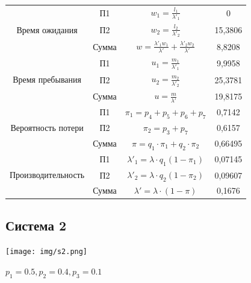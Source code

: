 \begin{tabular}{|c|c|c|c|}
\multirow{3}{*}{Время ожидания}     & П1     & $w_1=\frac{l_1}{\lambda'_1}$                                            & 0        \\ \cline{2-4}
                                    & П2     & $w_2=\frac{l_2}{\lambda'_2}$                                            & 15,3806  \\ \cline{2-4}
                                    & Сумма  & $w = \frac{\lambda'_1 w_1}{\lambda'} + \frac{\lambda'_2 w_2}{\lambda'}$ & 8,8208   \\ \hline
\multirow{3}{*}{Время пребывания}   & П1     & $u_1 = \frac{m_1}{\lambda'_1}$                                          & 9,9958  \\ \cline{2-4}
                                    & П2     & $u_2 = \frac{m_2}{\lambda'_2}$                                          & 25,3781  \\ \cline{2-4}
                                    & Сумма  & $u = \frac{m}{\lambda'}$                                                & 19,8175  \\ \hline
\multirow{3}{*}{Вероятность потери} & П1     & $\pi_1 = p_4 + p_5 + p_6 + p_7$                                         & 0,7142   \\ \cline{2-4}
                                    & П2     & $\pi_2 = p_3 + p_7$                                                     & 0,6157   \\ \cline{2-4}
                                    & Сумма  & $\pi = q_1 \cdot \pi_1 + q_2 \cdot \pi_2$                               & 0,66495  \\ \hline
\multirow{3}{*}{Производительность} & П1     & $\lambda'_1 = \lambda \cdot q_1(1 - \pi_1)$                             & 0,07145  \\ \cline{2-4}
                                    & П2     & $\lambda'_2 = \lambda \cdot q_2(1 - \pi_2)$                             & 0,09607  \\ \cline{2-4}
                                    & Сумма  & $\lambda' = \lambda \cdot (1 - \pi)$                                    & 0,1676   \\ \hline
\end{tabular}

\newpage
\subsection{Система 2}
\texttt{[image: img/s2.png]}

$p_1 = 0.5, p_2 = 0.4, p_3 = 0.1$\\

